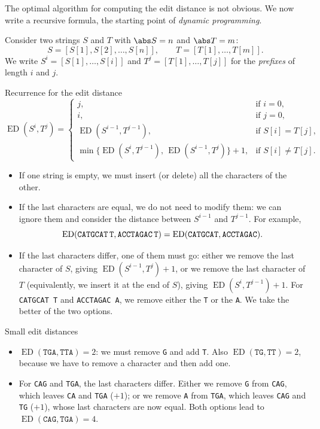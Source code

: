 \documentclass[a4paper,12pt,oneside]{report}
\newcommand{\ED}{\operatorname{ED}}
\begin{document}
The optimal algorithm for computing the edit distance is not obvious.
We now write a recursive formula, the starting point of
\emph{dynamic programming}.

\begin{notebox}[Notation]
Consider two strings $S$ and $T$ with $\abs S=n$ and $\abs T=m$:
\[
  S=[S[1],S[2],\ldots,S[n]],\qquad T=[T[1],\ldots,T[m]].
\]
We write $S^i=[S[1],\ldots,S[i]]$ and $T^j=[T[1],\ldots,T[j]]$ for the
\emph{prefixes} of length $i$ and $j$.
\end{notebox}

\begin{framedprop}{Recurrence for the edit distance}\label{prop:ed-recurrence}
\[
  \ED(S^i,T^j)=
  \begin{cases}
    j, & \text{if } i=0,\\
    i, & \text{if } j=0,\\
    \ED(S^{i-1},T^{j-1}), & \text{if } S[i]=T[j],\\
    \min\bigl\{\ED(S^i,T^{j-1}),\,\ED(S^{i-1},T^j)\bigr\}+1,
      & \text{if } S[i]\neq T[j].
  \end{cases}
\]
\end{framedprop}

\begin{itemize}
  \item If one string is empty, we must insert (or delete) all the
    characters of the other.
  \item If the last characters are equal, we do not need to modify
    them: we can ignore them and consider the distance between
    $S^{i-1}$ and $T^{j-1}$. For example,
    \[
      \ED(\texttt{CATGCAT\,T},\texttt{ACCTAGAC\,T})
      =\ED(\texttt{CATGCAT},\texttt{ACCTAGAC}).
    \]
  \item If the last characters differ, one of them must go: either we
    remove the last character of $S$, giving $\ED(S^{i-1},T^j)+1$, or
    we remove the last character of $T$ (equivalently, we insert it at
    the end of $S$), giving $\ED(S^i,T^{j-1})+1$. For
    \texttt{CATGCAT\,T} and \texttt{ACCTAGAC\,A}, we remove either the
    \texttt{T} or the \texttt{A}. We take the better of the two
    options.
\end{itemize}

\begin{framedexample}{Small edit distances}\label{ex:small-ed}
\begin{itemize}
  \item $\ED(\texttt{TGA},\texttt{TTA})=2$: we must remove
    \texttt{G} and add \texttt{T}. Also $\ED(\texttt{TG},\texttt{TT})=2$,
    because we have to remove a character and then add one.
  \item For \texttt{CAG} and \texttt{TGA}, the last characters
    differ. Either we remove \texttt{G} from \texttt{CAG}, which leaves
    \texttt{CA} and \texttt{TGA} ($+1$); or we remove \texttt{A} from
    \texttt{TGA}, which leaves \texttt{CAG} and \texttt{TG} ($+1$),
    whose last characters are now equal. Both options lead to
    $\ED(\texttt{CAG},\texttt{TGA})=4$.
\end{itemize}
\end{framedexample}
\end{document}
